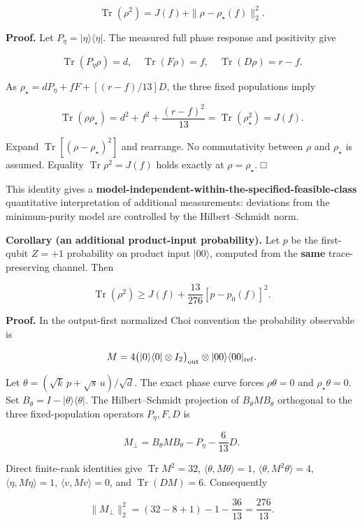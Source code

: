 \documentclass[
  10pt,
  a4paper,
]{article}
\begin{document}
\[
 \boxed{\operatorname{Tr}(\rho^2)=J(f)+\|\rho-\rho_\star(f)\|_2^2.}\tag{1}
\]

\textbf{Proof.} Let \(P_\eta=|\eta\rangle\langle\eta|\). The measured full phase response and positivity give

\[
 \operatorname{Tr}(P_\eta\rho)=d,\quad
 \operatorname{Tr}(F\rho)=f,\quad
 \operatorname{Tr}(D\rho)=r-f.
\]

As \(\rho_\star=dP_\eta+fF+[(r-f)/13]D\), the three fixed populations imply

\[
 \operatorname{Tr}(\rho\rho_\star)
 =d^2+f^2+\frac{(r-f)^2}{13}
 =\operatorname{Tr}(\rho_\star^2)=J(f).
\]

Expand \(\operatorname{Tr}[(\rho-\rho_\star)^2]\) and rearrange. No commutativity between \(\rho\) and \(\rho_\star\) is assumed. Equality \(\operatorname{Tr}\rho^2=J(f)\) holds exactly at \(\rho=\rho_\star\). □

This identity gives a \textbf{model-independent-within-the-specified-feasible-class} quantitative interpretation of additional measurements: deviations from the minimum-purity model are controlled by the Hilbert--Schmidt norm.

\textbf{Corollary (an additional product-input probability).} Let \(p\) be the first-qubit \(Z=+1\) probability on product input \(|00\rangle\), computed from the \textbf{same} trace-preserving channel. Then

\[
 \boxed{\operatorname{Tr}(\rho^2)\ge J(f)+\frac{13}{276}[p-p_0(f)]^2.}\tag{2}
\]

\textbf{Proof.} In the output-first normalized Choi convention the probability observable is

\[
 M=4\bigl(|0\rangle\langle0|\otimes I_2\bigr)_{\rm out}
 \otimes |00\rangle\langle00|_{\rm ref}.
\]

Let \(\theta=(\sqrt{k}\,p+\sqrt{s}\,u)/\sqrt d\). The exact phase curve forces \(\rho\theta=0\) and \(\rho_\star\theta=0\). Set \(B_\theta=I-|\theta\rangle\langle\theta|\). The Hilbert--Schmidt projection of \(B_\theta M B_\theta\) orthogonal to the three fixed-population operators \(P_\eta,F,D\) is

\[
 M_\perp=B_\theta M B_\theta-P_\eta-\frac6{13}D.
\]

Direct finite-rank identities give \(\operatorname{Tr}M^2=32\), \(\langle\theta,M\theta\rangle=1\), \(\langle\theta,M^2\theta\rangle=4\), \(\langle\eta,M\eta\rangle=1\), \(\langle v,Mv\rangle=0\), and \(\operatorname{Tr}(DM)=6\). Consequently

\[
 \|M_\perp\|_2^2=(32-8+1)-1-\frac{36}{13}=\frac{276}{13}.
\]
\end{document}
